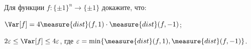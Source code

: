 Для функции $f\colon \{\pm 1\}^n \to \{\pm 1\}$ докажите, что:
\begin{enumcyr}
    \item $\Var[f] = 4 \measure{dist}(f, 1) \cdot \measure{dist}(f, -1)$;
    \item $2 \varepsilon \le \Var[f] \le 4 \varepsilon$, где $\varepsilon = \min \{\measure{dist}(f, 1),
        \measure{dist}(f, -1)\}$.
\end{enumcyr}